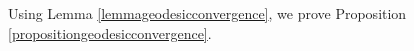 %
%
%
%
%
%

Using Lemma \ref{lemmageodesicconvergence}, we prove Proposition \ref{propositiongeodesicconvergence}.

